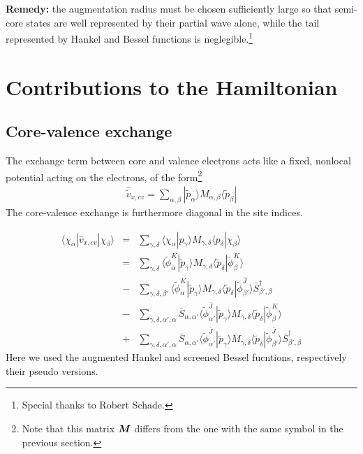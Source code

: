 \documentclass[11pt,a4paper]{report}
\begin{document}
\textbf{Remedy:} the augmentation radius must be chosen sufficiently
large so that semi-core states are well represented by their partial
wave alone, while the tail represented by Hankel and Bessel functions
is neglegible.\footnote{Special thanks to Robert Schade.}


\chapter{Contributions to the Hamiltonian}
\section{Core-valence exchange}
The exchange term between core and valence electrons acts like a
fixed, nonlocal potential acting on the electrons, of the
form\footnote{Note that this matrix $\bm{M}$ differs from the one
  with the same symbol in the previous section.}
\begin{eqnarray}
\hat{\tilde{v}}_{x,cv}=\sum_{\alpha,\beta}|\tilde{p}_\alpha\rangle 
M_{\alpha,\beta}\langle\tilde{p}_\beta|
\end{eqnarray}
The core-valence exchange is furthermore diagonal in the site indices.

\begin{eqnarray}
\langle\chi_\alpha|\hat{v}_{x,cv}|\chi_\beta\rangle
&=&
\sum_{\gamma,\delta}
\langle\chi_\alpha|p_\gamma\rangle 
M_{\gamma,\delta}\langle p_\delta|\chi_\beta\rangle
\nonumber\\
&=&
\sum_{\gamma,\delta}
\langle\tilde{\phi}^{K}_\alpha|\tilde{p}_\gamma\rangle 
M_{\gamma,\delta}
\langle\tilde{p}_\delta|\tilde{\phi}^{K}_\beta\rangle
\nonumber\\
&-&
\sum_{\gamma,\delta,\beta'}
\langle\tilde{\phi}^{K}_\alpha|\tilde{p}_\gamma\rangle 
M_{\gamma,\delta}
\langle\tilde{p}_\delta|\tilde{\phi}^{\bar{J}}_{\beta'}\rangle 
\bar{S}^\dagger_{\beta',\beta}
\nonumber\\
&-&
\sum_{\gamma,\delta,\alpha',\alpha}
\bar{S}_{\alpha,\alpha'}
\langle\tilde{\phi}^{\bar{J}}_{\alpha'}|\tilde{p}_\gamma\rangle 
M_{\gamma,\delta}
\langle\tilde{p}_\delta|\tilde{\phi}^{K}_{\beta}\rangle 
\nonumber\\
&+&
\sum_{\gamma,\delta,\alpha',\alpha}
\bar{S}_{\alpha,\alpha'}
\langle\tilde{\phi}^{\bar{J}}_{\alpha'}|\tilde{p}_\gamma\rangle 
M_{\gamma,\delta}
\langle\tilde{p}_\delta|\tilde{\phi}^{\bar{J}}_{\beta'}\rangle 
\bar{S}^\dagger_{\beta',\beta}
\end{eqnarray}
Here we used the augmented Hankel and screened Bessel fucntions,
respectively their pseudo versions.
\end{document}
